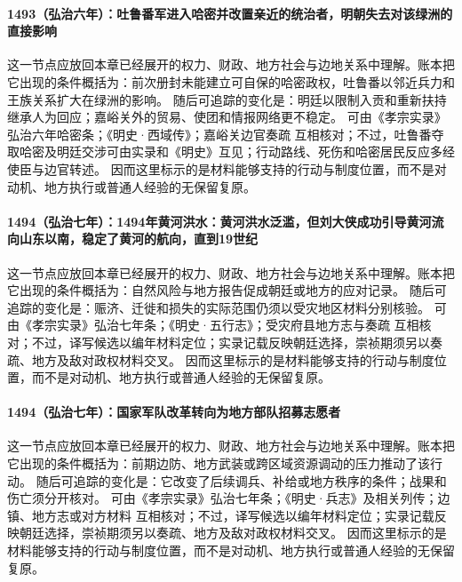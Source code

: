 \paragraph{1493（弘治六年）：吐鲁番军进入哈密并改置亲近的统治者，明朝失去对该绿洲的直接影响} 这一节点应放回本章已经展开的权力、财政、地方社会与边地关系中理解。账本把它出现的条件概括为：前次册封未能建立可自保的哈密政权，吐鲁番以邻近兵力和王族关系扩大在绿洲的影响。 随后可追踪的变化是：明廷以限制入贡和重新扶持继承人为回应；嘉峪关外的贸易、使团和情报网络更不稳定。 可由《孝宗实录》弘治六年哈密条；《明史·西域传》；嘉峪关边官奏疏 互相核对；不过，吐鲁番夺取哈密及明廷交涉可由实录和《明史》互见；行动路线、死伤和哈密居民反应多经使臣与边官转述。 因而这里标示的是材料能够支持的行动与制度位置，而不是对动机、地方执行或普通人经验的无保留复原。

\paragraph{1494（弘治七年）：1494年黄河洪水：黄河洪水泛滥，但刘大侠成功引导黄河流向山东以南，稳定了黄河的航向，直到19世纪} 这一节点应放回本章已经展开的权力、财政、地方社会与边地关系中理解。账本把它出现的条件概括为：自然风险与地方报告促成朝廷或地方的应对记录。 随后可追踪的变化是：赈济、迁徙和损失的实际范围仍须以受灾地区材料分别核验。 可由《孝宗实录》弘治七年条；《明史·五行志》；受灾府县地方志与奏疏 互相核对；不过，译写候选以编年材料定位；实录记载反映朝廷选择，崇祯期须另以奏疏、地方及敌对政权材料交叉。 因而这里标示的是材料能够支持的行动与制度位置，而不是对动机、地方执行或普通人经验的无保留复原。

\paragraph{1494（弘治七年）：国家军队改革转向为地方部队招募志愿者} 这一节点应放回本章已经展开的权力、财政、地方社会与边地关系中理解。账本把它出现的条件概括为：前期边防、地方武装或跨区域资源调动的压力推动了该行动。 随后可追踪的变化是：它改变了后续调兵、补给或地方秩序的条件；战果和伤亡须分开核对。 可由《孝宗实录》弘治七年条；《明史·兵志》及相关列传；边镇、地方志或对方材料 互相核对；不过，译写候选以编年材料定位；实录记载反映朝廷选择，崇祯期须另以奏疏、地方及敌对政权材料交叉。 因而这里标示的是材料能够支持的行动与制度位置，而不是对动机、地方执行或普通人经验的无保留复原。

